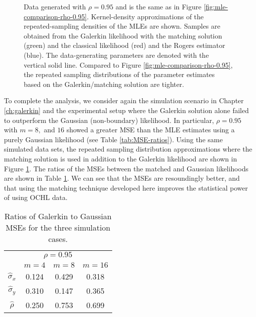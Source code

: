 \begin{figure}
  \caption{Data generated with $\rho=0.95$ and is the same as in
    Figure \ref{fig:mle-comparison-rho-0.95}. Kernel-density
    approximations of the repeated-sampling densities of the MLEs are
    shown.  Samples are obtained from the Galerkin likelihood with the
    matching solution (green) and the classical likelihood (red) and
    the Rogers estimator (blue). The data-generating parameters are
    denoted with the vertical solid line. Compared to Figure
    \ref{fig:mle-comparison-rho-0.95}, the repeated sampling
    distributions of the parameter estimates based on the
    Galerkin/matching solution are tighter.}
  \label{fig:mle-comparison-rho-0.95-matched}
\end{figure}

To complete the analysis, we consider again the simulation scenario in
Chapter \ref{ch:galerkin} and the experimental setup where the
Galerkin solution alone failed to outperform the Gaussian
(non-boundary) likelihood. In particular, $\rho=0.95$ with $m = 8,$
and $16$ showed a greater MSE than the MLE estimates using a purely
Gaussian likelihood (see Table \ref{tab:MSE-ratios}). Using the same
simulated data sets, the repeated sampling distribution approximations
where the matching solution is used in addition to the Galerkin
likelihood are shown in Figure
\ref{fig:mle-comparison-rho-0.95-matched}. The ratios of the MSEs
between the matched and Gaussian likelihoods are shown in Table
\ref{tab:MSE-ratios-matched}. We can see that the MSEs are
resoundingly better, and that using the matching technique developed
here improves the statistical power of using OCHL data.

\begin{table}
  \centering
  \begin{tabular}{cccc}
    \multicolumn{4}{c}{$\rho=0.95$} \\
    & $m=4$ & $m=8$ & $m=16$ \\
    \hline
    $\hat{\sigma}_x$ & 0.124 & 0.429  & 0.318 \\
    \hline
    $\hat{\sigma}_y$ & 0.310 & 0.147  & 0.365 \\
    \hline
    $\hat{\rho}$ & 0.250 & 0.753 & 0.699
  \end{tabular}
  \caption{Ratios of Galerkin to Gaussian MSEs for the three simulation cases.}
  \label{tab:MSE-ratios-matched}
\end{table}



